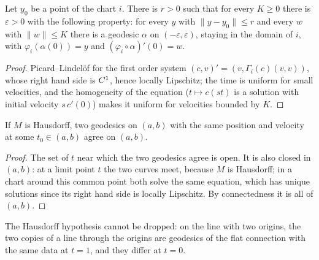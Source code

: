 \begin{theorem}
  \label{thm:geodesic-existence}
  \leanok
  Let $y_0$ be a point of the chart $i$. There is $r > 0$ such that for every $K \ge 0$ there is
  $\varepsilon > 0$ with the following property: for every $y$ with $\|y - y_0\| \le r$ and every
  $w$ with $\|w\| \le K$ there is a geodesic $\alpha$ on $(-\varepsilon, \varepsilon)$, staying in
  the domain of $i$, with $\varphi_i(\alpha(0)) = y$ and $(\varphi_i \circ \alpha)'(0) = w$.
\end{theorem}

\begin{proof}
  \leanok
  Picard--Lindel\"of for the first order system $(c, v)' = (v, \Gamma_i(c)(v, v))$, whose right
  hand side is $C^{1}$, hence locally Lipschitz; the time is uniform for small velocities, and the
  homogeneity of the equation ($t \mapsto c(st)$ is a solution with initial velocity $s\, c'(0)$)
  makes it uniform for velocities bounded by $K$.
\end{proof}

\begin{theorem}
  \label{thm:geodesic-uniqueness}
  \leanok
  If $M$ is Hausdorff, two geodesics on $(a, b)$ with the same position and velocity at some
  $t_0 \in (a, b)$ agree on $(a, b)$.
\end{theorem}

\begin{proof}
  \leanok
  The set of $t$ near which the two geodesics agree is open. It is also closed in $(a, b)$: at a
  limit point $t$ the two curves meet, because $M$ is Hausdorff; in a chart around this common
  point both solve the same equation, which has unique solutions since its right hand side is
  locally Lipschitz. By connectedness it is all of $(a, b)$.
\end{proof}

\begin{remark}
  The Hausdorff hypothesis cannot be dropped: on the line with two origins, the two copies of a
  line through the origins are geodesics of the flat connection with the same data at $t = 1$, and
  they differ at $t = 0$.
\end{remark}

